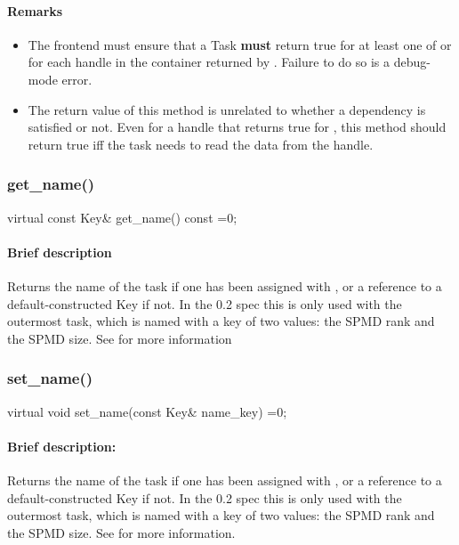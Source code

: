 \paragraph{Remarks} 
\begin{itemize}
\item The frontend must ensure that a Task {\bf must} return true for at least one of
        or  for each handle in the container returned by
       .  Failure to do so is a debug-mode error.
\item The return value of this method is unrelated to whether a dependency is
       satisfied or not.  Even for a handle that returns true for ,
       this method should return true iff the task needs to read the data from the handle.
\end{itemize}     


\subsubsection{get\_name()}
\begin{CppCode}
    virtual const Key&
    get_name() const =0;
\end{CppCode}

\paragraph{Brief description} Returns the name of the task if one has been assigned with , or
       a reference to a default-constructed Key if not.
       In the 0.2 spec this is only used with the outermost task, which is named with
       a key of two  values: the SPMD rank and the SPMD size.  See 
       for more information


\subsubsection{set\_name()}
\begin{CppCode}
    virtual void
    set_name(const Key& name_key) =0;
\end{CppCode}

\paragraph{Brief description:} Returns the name of the task if one has been assigned with , or
       a reference to a default-constructed Key if not.
       In the 0.2 spec this is only used with the outermost task, which is named with
       a key of two  values: the SPMD rank and the SPMD size.  See 
       for more information.


